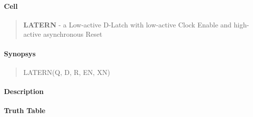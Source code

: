 \label{LATERN}
\paragraph{Cell}
\begin{quote}
    \textbf{LATERN} - a Low-active D-Latch with low-active Clock Enable and high-active asynchronous Reset
\end{quote}

\paragraph{Synopsys}
\begin{quote}
    LATERN(Q, D, R, EN, XN)
\end{quote}

\paragraph{Description}

%

\paragraph{Truth Table}
%


